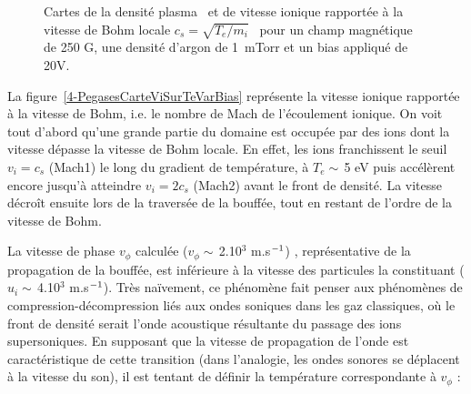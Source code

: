 \begin{refsection}
\begin{figure}[!htbp] 
  \centering
    \caption{Cartes de la densité plasma~ et
    de vitesse ionique rapportée à la
    vitesse de Bohm locale
    $c_s=\sqrt{T_e/m_i}$~ pour un champ
    magnétique de 250 G, une densité d'argon de 1~mTorr et un bias appliqué de
    20V.}
    \label{4-PegasesVaguesIoniques}
\end{figure}
 
 La figure~\ref{4-PegasesCarteViSurTeVarBias} représente la vitesse ionique
 rapportée à la vitesse de Bohm, i.e. le nombre de Mach de
 l'écoulement ionique. On voit tout d'abord qu'une grande partie du domaine est
 occupée par des ions dont la vitesse dépasse la vitesse de Bohm locale. En
 effet, les ions franchissent le seuil $v_i=c_s$ (Mach1) le long du gradient de
 température, à $T_e\sim\,$5 eV puis accélèrent encore jusqu'à atteindre
 $v_i=2c_s$ (Mach2) avant le front de densité. La vitesse décroît ensuite lors
 de la traversée de la bouffée, tout en restant de l'ordre de la vitesse de
 Bohm.
 
 La vitesse de phase $v_\phi$ calculée ($v_\phi\sim\,$2.10$^3$
 m.s$^{{-1}}$) , représentative de la propagation de la bouffée, est inférieure à la
 vitesse des particules la constituant ($u_i\sim\,$4.10$^3$
 m.s$^{{-1}}$). Très naïvement, ce phénomène fait penser aux phénomènes
 de compression-décompression liés aux ondes soniques dans les gaz
 classiques, où le front de densité serait l'onde acoustique
 résultante du passage des ions supersoniques. En supposant que la vitesse de
 propagation de l'onde est caractéristique de cette transition (dans
 l'analogie, les ondes sonores se déplacent à la vitesse du son), il est
 tentant de définir la température correspondante à $v_\phi$ :
 

\end{refsection}
